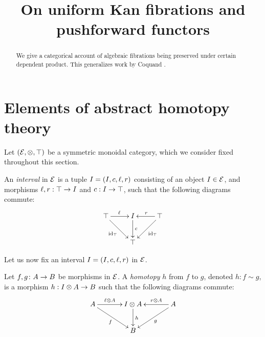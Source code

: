 \documentclass[reqno,10pt,a4paper,oneside]{amsart}
\title{On uniform Kan fibrations and pushforward functors}
\begin{document}
\begin{abstract}
We give a categorical account of algebraic fibrations being preserved under certain dependent product.
This generalizes work by Coquand \etal.
\end{abstract}

\maketitle

\tableofcontents





\section{Elements of abstract homotopy theory} 

Let $(\mathcal{E}, \otimes, \top)$ be a symmetric monoidal category, which we consider fixed throughout this section. 

\begin{definition} An \emph{interval} in $\mathcal{E}$ is a tuple $I = (I, c, \ell, r)$ consisting of  an object $I \in \mathcal{E}$, 
and morphisms $\ell, r : \top \to I$ and $c : I \to \top$,   such that the following diagrams commute:
\[
\xymatrix{
\unit \ar[r]^\intervall \ar[dr]_{\id_\unit} & \interval \ar[d]^-{c} & \unit \ar[dl]^{\id_\unit} \ar[l]_{\intervalr}  \\
 & \unit & }
 \]
\end{definition}

Let us now fix an interval $I = (I, c, \ell, r)$ in $\mathcal{E}$. 


\begin{definition}
\label{def:homotopy}
Let $f, g \colon A \to B$ be morphisms in $\mathcal{E}$. A \emph{homotopy} $h$ from $f$ to $g$, denoted $h : f \sim g$, is a morphism $h : I \otimes A \to B$ such that the following diagrams commute:
\[
\xymatrix@C=1.2cm{
A \ar[r]^-{\intervall \otimes A} \ar[dr]_{f} & \interval \otimes A \ar[d]^{h} & A \ar[dl]^{g} \ar[l]_-{r \otimes A}  \\
 & B & }
 \]
\end{definition}
\end{document}

